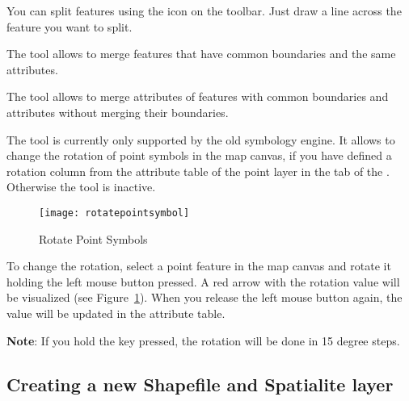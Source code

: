 
You can split features using the  icon on the toolbar. Just draw a line across the feature you
want to split.


The  tool allows to
merge features that have common boundaries and the same attributes.


The  
tool allows to merge attributes of features with common boundaries and 
attributes without merging their boundaries.


The  tool is 
currently only supported by the old symbology engine. It allows to change the 
rotation of point symbols in the map canvas, if you have defined a rotation 
column from the attribute table of the point layer in the  tab of 
the . Otherwise the tool is inactive.

\begin{figure}[ht]
   \centering
   \texttt{[image: rotatepointsymbol]}
   \caption{Rotate Point Symbols \nixcaption}\label{fig:rotatepoint}
\end{figure}

To change the rotation, select a point feature in the map canvas and rotate
it holding the left mouse button pressed. A red arrow with the rotation value
will be visualized (see Figure~\ref{fig:rotatepoint}). When you release the
left mouse button again, the value will be updated in the attribute table.

\textbf{Note}: If you hold the  key pressed, the rotation will be done
in 15 degree steps.

\subsection{Creating a new Shapefile and Spatialite layer}\label{sec:create shape}

